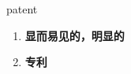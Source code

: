 
\begin{frame}
{\huge patent}
\begin{center}
\begin{enumerate}\Large
  \item \textbf{显而易见的，明显的}
  \item \textbf{专利}
\end{enumerate}
\end{center}
\end{frame}
